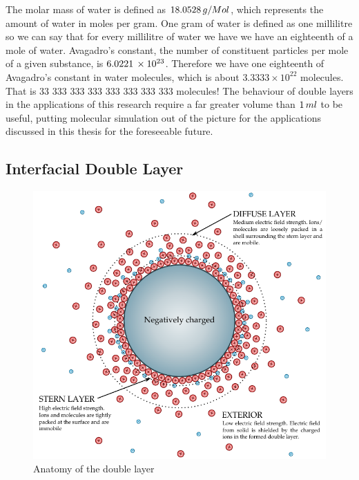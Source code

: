     The molar mass of water is defined as $18.0528\thinspace g/Mol$, which represents the amount of water in moles per gram. One gram of water is defined as one millilitre so we can say that for every millilitre of water we have we have an eighteenth of a mole of water. Avagadro's constant, the number of constituent particles per mole of a given substance, is $6.0221\thinspace \times 10^{23}$. Therefore we have one eighteenth of Avagadro's constant in water molecules, which is about $3.3333\times 10^{22}$ molecules. That is 33 333 333 333 333 333 333 333 molecules! The behaviour of double layers in the applications of this research require a far greater volume than $1\thinspace ml$ to be useful, putting molecular simulation out of the picture for the applications discussed in this thesis for the foreseeable future.

  \subsection{Interfacial Double Layer}

    \begin{figure}
      \begin{center}
        \includegraphics{content/introduction/graphics/doubleLayer_labelled.pdf}
      \end{center}
      \caption{Anatomy of the double layer}
      \label{fig:doubleLayer_anatomy}
    \end{figure}

